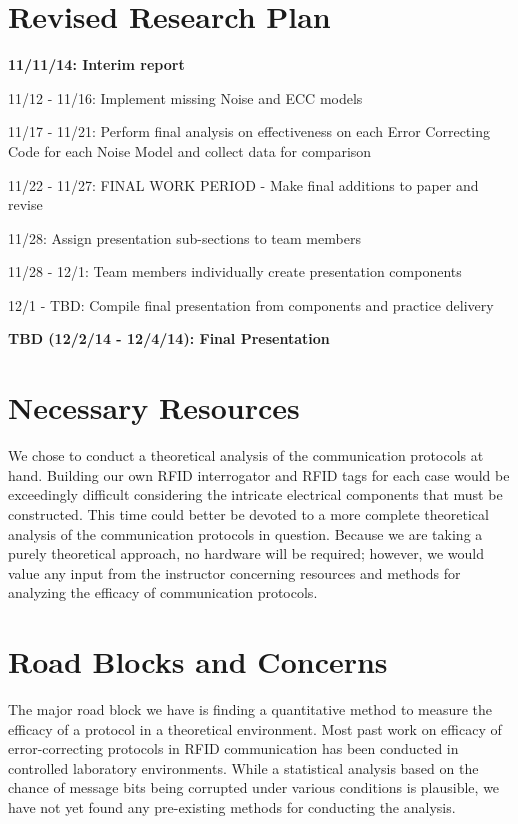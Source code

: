 \documentclass{sigcomm-alternate}
\begin{document}
\section{Revised Research Plan}

\textbf{11/11/14: Interim report}

11/12 - 11/16: Implement missing Noise and ECC models

11/17 - 11/21: Perform final analysis on effectiveness on each Error Correcting Code for each Noise Model and collect data for comparison

11/22 - 11/27: FINAL WORK PERIOD - Make final additions to paper and revise

11/28: Assign presentation sub-sections to team members

11/28 - 12/1: Team members individually create presentation components

12/1 - TBD: Compile final presentation from components and practice delivery

\textbf{TBD (12/2/14 - 12/4/14): Final Presentation}


\section{Necessary Resources}
We chose to conduct a theoretical analysis of the communication protocols at hand. Building our own RFID interrogator and RFID tags for each case would be exceedingly difficult considering the intricate electrical components that must be constructed. This time could better be devoted to a more complete theoretical analysis of the communication protocols in question.  Because we are taking a purely theoretical approach, no hardware will be required; however, we would value any input from the instructor concerning resources and methods for analyzing the efficacy of communication protocols.

\section{Road Blocks and Concerns}
The major road block we have is finding a quantitative method to measure the efficacy of a protocol in a theoretical environment. Most past work on efficacy of error-correcting protocols in RFID communication has been conducted in controlled laboratory environments. While a statistical analysis based on the chance of message bits being corrupted under various conditions is plausible, we have not yet found any pre-existing methods for conducting the analysis.

\nocite{*}

 

\balancecolumns
\end{document}
